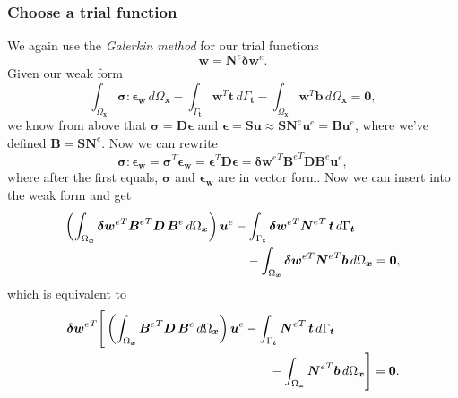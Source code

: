 \documentclass[acmtog]{acmart}
\begin{document}
\subsubsection{Choose a trial function}
We again use the \textit{Galerkin method}  for our trial functions
%
\begin{equation}
  \boldsymbol w = \boldsymbol N^e \boldsymbol \delta\boldsymbol w^e.
\end{equation}
%
Given our weak form
%
\begin{equation}
  \int_{\Omega_{\boldsymbol x}} \boldsymbol \sigma : \boldsymbol \epsilon_{\boldsymbol w} \, d\Omega_{\boldsymbol x}- \int_{\Gamma_{\boldsymbol t}} \boldsymbol w^T \boldsymbol t \, d\Gamma_{\boldsymbol t}- \int_{\Omega_{\boldsymbol x}} \boldsymbol w^T \boldsymbol b \, d\Omega_{\boldsymbol x} = \boldsymbol 0,
\end{equation}
%
we know from above that $\boldsymbol \sigma = \boldsymbol D \boldsymbol
  \epsilon$ and $\boldsymbol \epsilon = \boldsymbol S \boldsymbol u \approx
  \boldsymbol S \boldsymbol N^e \boldsymbol u^e = \boldsymbol B \boldsymbol u^e$,
where we've defined $\boldsymbol B = \boldsymbol S \boldsymbol N^e$. Now we can
rewrite
%
\begin{equation}
  \boldsymbol \sigma : \boldsymbol \epsilon_{\boldsymbol w} = \boldsymbol \sigma^T \boldsymbol \epsilon_{\boldsymbol w} = \boldsymbol \epsilon^T \boldsymbol D \boldsymbol \epsilon = \boldsymbol \delta{\boldsymbol w^e}^T {\boldsymbol B^e}^T \boldsymbol D \boldsymbol B^e \boldsymbol u^e,
\end{equation}
%
where after the first equals, $\boldsymbol \sigma$ and $\boldsymbol
  \epsilon_{\boldsymbol w}$ are in vector form. Now we can insert into the weak
form and get
%
\begin{align}
  \left( \int_{\Omega_{\boldsymbol x}} \boldsymbol \delta{\boldsymbol w^e}^T {\boldsymbol B^e}^T \boldsymbol D \, \boldsymbol B^e \, d\Omega_{\boldsymbol x} \right) \boldsymbol u^e
  &- \int_{\Gamma_{\boldsymbol t}} \boldsymbol \delta{\boldsymbol w^e}^T {\boldsymbol N^e}^T  \, \boldsymbol t \, d\Gamma_{\boldsymbol t} \notag \\
  & \quad - \int_{\Omega_{\boldsymbol x}} \boldsymbol \delta{\boldsymbol w^e}^T {\boldsymbol N^e}^T \boldsymbol b \, d\Omega_{\boldsymbol x} = \boldsymbol 0,
\end{align}
%
which is equivalent to
%
\begin{align}
  \boldsymbol \delta{\boldsymbol w^e}^T\Bigg[\left( \int_{\Omega_{\boldsymbol x}} {\boldsymbol B^e}^T \boldsymbol D \, \boldsymbol B^e \, d\Omega_{\boldsymbol x} \right) \boldsymbol u^e
  & - \int_{\Gamma_{\boldsymbol t}} {\boldsymbol N^e}^T  \, \boldsymbol t \, d\Gamma_{\boldsymbol t} \notag \\
  & \qquad - \int_{\Omega_{\boldsymbol x}} {\boldsymbol N^e}^T \boldsymbol b \, d\Omega_{\boldsymbol x} \Bigg] = \boldsymbol 0.
\end{align}
\end{document}
